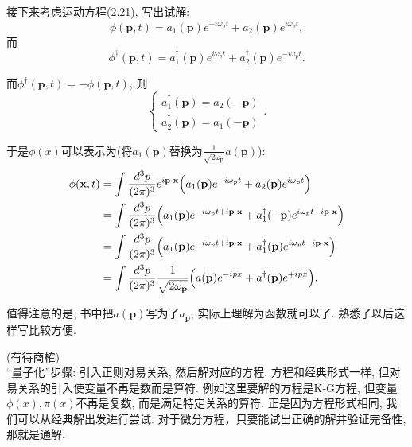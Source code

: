 \documentclass[cn,hazy,blue,11pt,device=normal,chinesefont=founder]{elegantnote}
\begin{document}
接下来考虑运动方程(2.21), 写出试解: 
\begin{equation}
  \phi(\mathbf{p}, t) = a_1(\mathbf{p})e^{-i\omega_p t} + a_2(\mathbf{p})e^{i\omega_p t}, 
\end{equation}
而
\begin{equation}
  \phi^{\dagger}(\mathbf{p}, t) = a_1^{\dagger}(\mathbf{p})e^{i\omega_p t} + a_2^{\dagger}(\mathbf{p})e^{-i\omega_p t}. 
\end{equation}

而$\phi^{\dagger}(\mathbf{p}, t) = -\phi(\mathbf{p}, t)$, 则
\begin{equation}
  \left\{\begin{array}{c} a_1^{\dagger}(\mathbf{p}) = a_2(\mathbf{-p})\\ a_2^{\dagger}(\mathbf{p}) = a_1(\mathbf{-p})\end{array}\right..
\end{equation}

于是$\phi(x)$可以表示为(将$a_1(\mathbf{p})$替换为$\frac{1}{\sqrt{2\omega_\mathbf{p}}} a(\mathbf{p})$): 
\begin{equation}
  \begin{aligned}
  \phi(\mathbf{x}, t) &= \int \frac{d^3 p}{(2\pi)^3}e^{i\mathbf{p \cdot x}}\Bigl(a_1(\mathbf{p})e^{-i\omega_p t} + a_2(\mathbf{p})e^{i\omega_p t}\Bigr) \\
  &= \int \frac{d^3 p}{(2\pi)^3}\Bigl(a_1(\mathbf{p})e^{-i\omega_p t +i\mathbf{p \cdot x}} + a_1^{\dagger}(-\mathbf{p})e^{i\omega_p t+i\mathbf{p \cdot x}}\Bigr) \\
  &= \int \frac{d^3 p}{(2\pi)^3}\Bigl(a_1(\mathbf{p})e^{-i\omega_p t + i\mathbf{p \cdot x}} + a_1^{\dagger}(\mathbf{p})e^{i\omega_p t - i\mathbf{p \cdot x}}\Bigr) \\
  &= \int \frac{d^3 p}{(2\pi)^3} \frac{1}{\sqrt{2 \omega_\mathbf{p}}} \Bigl(a(\mathbf{p})e^{-ipx} + a^{\dagger}(\mathbf{p})e^{+ipx}\Bigr). 
  \end{aligned}
\end{equation}

值得注意的是, 书中把$a(\mathbf{p})$写为了$a_\mathbf{p}$, 实际上理解为函数就可以了. 熟悉了以后这样写比较方便. 

\begin{remark}
  (有待商榷)\\
  “量子化”步骤: 引入正则对易关系, 然后解对应的方程. 方程和经典形式一样, 但对易关系的引入使变量不再是数而是算符.
  例如这里要解的方程是K-G方程, 但变量$\phi(x),\pi(x)$不再是复数, 而是满足特定关系的算符. 正是因为方程形式相同, 
  我们可以从经典解出发进行尝试. 对于微分方程，只要能试出正确的解并验证完备性, 那就是通解. 
\end{remark}
\end{document}
